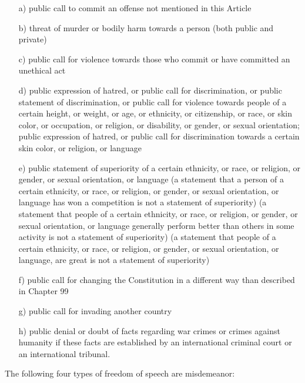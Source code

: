 \documentclass[11pt]{article}
\theoremstyle{remark}
\theoremstyle{definition}
\begin{document}
\begin{itemize}

\item[a)] public call to commit an offense not mentioned in this Article
\item[b)] threat of murder or bodily harm towards a person (both public and private)
\item[c)] public call for violence towards those who commit or have committed an unethical act
\item[d)] public expression of hatred, or public call for discrimination, or public statement of discrimination, or public call for violence towards people of a certain height, or weight, or age, or ethnicity, or citizenship, or race, or skin color, or occupation, or religion, or disability, or gender, or sexual orientation; public expression of hatred, or public call for discrimination towards a certain skin color, or religion, or language
\item[e)] public statement of superiority of a certain ethnicity, or race, or religion, or gender, or sexual orientation, or language (a statement that a person of a certain ethnicity, or race, or religion, or gender, or sexual orientation, or language has won a competition is not a statement of superiority) (a statement that people of a certain ethnicity, or race, or religion, or gender, or sexual orientation, or language generally perform better than others in some activity is not a statement of superiority) (a statement that people of a certain ethnicity, or race, or religion, or gender, or sexual orientation, or language, are great is not a statement of superiority)
\item[f)] public call for changing the Constitution in a different way than described in Chapter 99
\item[g)] public call for invading another country
\item[h)] public denial or doubt of facts regarding war crimes or crimes against humanity if these facts are established by an international criminal court or an international tribunal.

\end{itemize}

The following four types of freedom of speech are misdemeanor:
\end{document}
